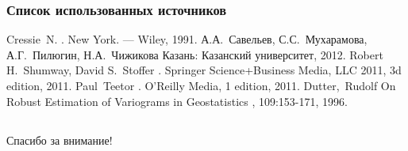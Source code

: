 \documentclass[10pt,pdf,aspectratio=169,hyperref={unicode}]{beamer}
\begin{document}
\begin{frame}
  \frametitle{Список использованных источников}
  \begin{scriptsize}
  \begin{thebibliography}{5}
    \beamertemplatebookbibitems
      Cressie~N.
      .
      \newblock New York. --- Wiley, 1991.
    \beamertemplatebookbibitems
      А.А.~Савельев, С.С.~Мухарамова, А.Г.~Пилюгин, Н.А.~Чижикова
      \newblock Казань: Казанский университет, 2012.
    \beamertemplatebookbibitems
      Robert H.~Shumway, David S.~Stoffer
      .
      \newblock Springer Science+Business Media, LLC 2011, 3d edition, 2011.
    \beamertemplatebookbibitems
      Paul~Teetor
      .
      \newblock O’Reilly Media, 1 edition, 2011.
    \beamertemplatearticlebibitems
      Dutter,~Rudolf
      \newblock On Robust Estimation of Variograms in Geostatistics
      , 109:153-171, 1996.
  \end{thebibliography}
\end{scriptsize}
\end{frame}

\subsection{}
\begin{frame}
  \frametitle{}
  \begin{center}
    {\Huge Спасибо за внимание!}
  \end{center}
\end{frame}
\end{document}
